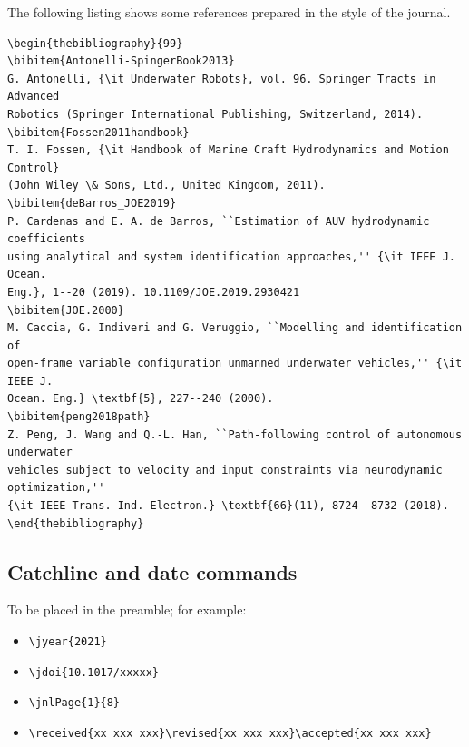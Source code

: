 \documentclass[DTMColor]{ROB-New}
\begin{document}
The following listing shows some references prepared in the style of the
journal.
%
{\fontsize{7}{9}\selectfont
\begin{verbatim}
\begin{thebibliography}{99}
\bibitem{Antonelli-SpingerBook2013}
G. Antonelli, {\it Underwater Robots}, vol. 96. Springer Tracts in Advanced
Robotics (Springer International Publishing, Switzerland, 2014).
\bibitem{Fossen2011handbook}
T. I. Fossen, {\it Handbook of Marine Craft Hydrodynamics and Motion Control}
(John Wiley \& Sons, Ltd., United Kingdom, 2011).
\bibitem{deBarros_JOE2019}
P. Cardenas and E. A. de Barros, ``Estimation of AUV hydrodynamic coefficients
using analytical and system identification approaches,'' {\it IEEE J. Ocean.
Eng.}, 1--20 (2019). 10.1109/JOE.2019.2930421
\bibitem{JOE.2000}
M. Caccia, G. Indiveri and G. Veruggio, ``Modelling and identification of
open-frame variable configuration unmanned underwater vehicles,'' {\it IEEE J.
Ocean. Eng.} \textbf{5}, 227--240 (2000).
\bibitem{peng2018path}
Z. Peng, J. Wang and Q.-L. Han, ``Path-following control of autonomous underwater
vehicles subject to velocity and input constraints via neurodynamic optimization,''
{\it IEEE Trans. Ind. Electron.} \textbf{66}(11), 8724--8732 (2018).
\end{thebibliography}
\end{verbatim}}
%
\subsection{Catchline and date commands}

To be placed in the preamble; for example:

\begin{itemize}
  \item \verb"\jyear{2021}"
  \item \verb"\jdoi{10.1017/xxxxx}"
  \item \verb"\jnlPage{1}{8}"
  \item \verb"\received{xx xxx xxx}\revised{xx xxx xxx}\accepted{xx xxx xxx}"
\end{itemize}
\end{document}
